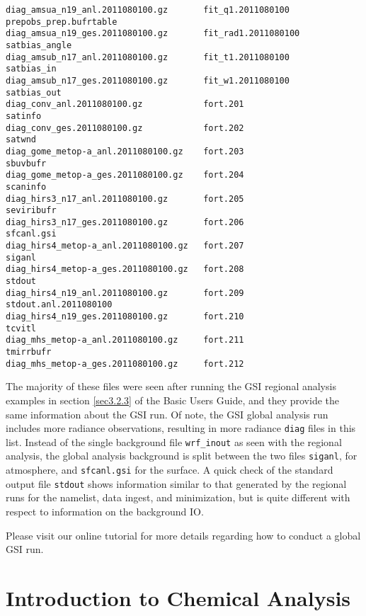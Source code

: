 \begin{scriptsize}
\begin{verbatim}
diag_amsua_n19_anl.2011080100.gz       fit_q1.2011080100                    prepobs_prep.bufrtable
diag_amsua_n19_ges.2011080100.gz       fit_rad1.2011080100                  satbias_angle
diag_amsub_n17_anl.2011080100.gz       fit_t1.2011080100                    satbias_in
diag_amsub_n17_ges.2011080100.gz       fit_w1.2011080100                    satbias_out
diag_conv_anl.2011080100.gz            fort.201                             satinfo
diag_conv_ges.2011080100.gz            fort.202                             satwnd
diag_gome_metop-a_anl.2011080100.gz    fort.203                             sbuvbufr
diag_gome_metop-a_ges.2011080100.gz    fort.204                             scaninfo
diag_hirs3_n17_anl.2011080100.gz       fort.205                             seviribufr
diag_hirs3_n17_ges.2011080100.gz       fort.206                             sfcanl.gsi
diag_hirs4_metop-a_anl.2011080100.gz   fort.207                             siganl
diag_hirs4_metop-a_ges.2011080100.gz   fort.208                             stdout
diag_hirs4_n19_anl.2011080100.gz       fort.209                             stdout.anl.2011080100
diag_hirs4_n19_ges.2011080100.gz       fort.210                             tcvitl
diag_mhs_metop-a_anl.2011080100.gz     fort.211                             tmirrbufr
diag_mhs_metop-a_ges.2011080100.gz     fort.212
\end{verbatim}
\end{scriptsize}

The majority of these files were seen after running the GSI regional analysis examples in section \ref{sec3.2.3} of the Basic User\textquotesingle s 
Guide, and they provide the same information about the GSI run. Of note, the GSI global analysis run includes more radiance observations, resulting 
in more radiance \verb|diag| files in this list. Instead of the single background file \verb|wrf_inout| as seen with the regional analysis, the global analysis 
background is split between the two files \verb|siganl|, for atmosphere, and \verb|sfcanl.gsi| for the surface. A quick check of the standard output file 
\verb|stdout| shows information similar to that generated by the regional runs for the namelist, data ingest, and minimization, but is quite different with 
respect to information on the background IO.

Please visit our online tutorial for more details regarding how to conduct a global GSI run.

\section{Introduction to Chemical Analysis}

